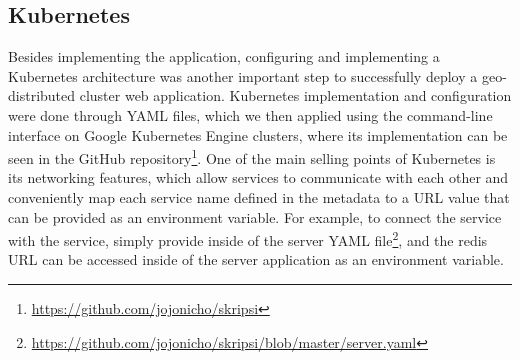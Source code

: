 \subsection{Kubernetes}
\label{sec:kubernetes-implementation}
Besides implementing the application, configuring and implementing a Kubernetes architecture was another important step to successfully deploy a geo-distributed cluster web application. Kubernetes implementation and configuration were done through YAML files, which we then applied using the  command-line interface on Google Kubernetes Engine clusters, where its implementation can be seen in the GitHub repository\footnote{\url{https://github.com/jojonicho/skripsi}}. One of the main selling points of Kubernetes is its networking features, which allow services to communicate with each other and conveniently map each service name defined in the metadata to a URL value that can be provided as an environment variable. For example, to connect the  service with the  service, simply provide  inside of the server YAML file\footnote{\url{https://github.com/jojonicho/skripsi/blob/master/server.yaml}}, and the redis URL can be accessed inside of the server application as an environment variable.


% 

% 

% 


